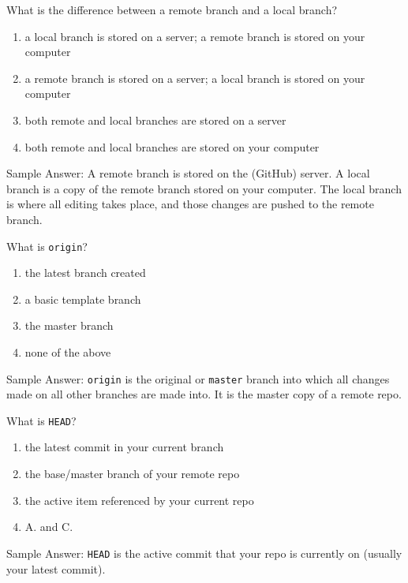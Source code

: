 \documentclass[12pt,fleqn]{examtst}
\begin{document}

\newpage
\noindent
\begin{minipage}{\textwidth}

What is the difference between a remote branch and a local branch?

\begin{enumerate}
    \item a local branch is stored on a server; a remote branch is stored on your computer
    \item a remote branch is stored on a server; a local branch is stored on your computer \marker
    \item both remote and local branches are stored on a server
    \item both remote and local branches are stored on your computer
\end{enumerate}
Sample Answer: A remote branch is stored on the (GitHub) server. A local branch is a copy of the remote branch stored on your computer. The local branch is where all editing takes place, and those changes are pushed to the remote branch.

What is \lstinline{origin}?

\begin{enumerate}
    \item the latest branch created
    \item a basic template branch
    \item the master branch \marker
    \item none of the above
\end{enumerate}
Sample Answer: \lstinline{origin} is the original or \lstinline{master} branch into which all changes made on all other branches are made into. It is the master copy of a remote repo.

What is \lstinline{HEAD}?

\begin{enumerate}
    \item the latest commit in your current branch
    \item the base/master branch of your remote repo
    \item the active item referenced by your current repo
    \item A. and C. \marker
\end{enumerate}
Sample Answer: \lstinline{HEAD} is the active commit that your repo is currently on (usually your latest commit).

\end{minipage}
\end{document}
